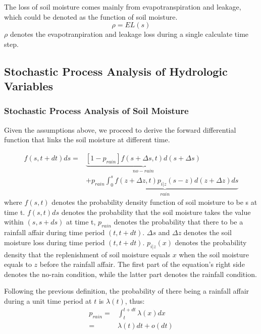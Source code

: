 \documentclass[11pt]{article}
\begin{document}
The loss of soil moisture comes mainly from evapotranspiration and leakage, which could be denoted as the function of soil moisture.
\begin{equation}
\rho=EL(s)
\end{equation}
$\rho$ denotes the evapotranpiration and leakage loss during a single calculate time step.
\subsection{Stochastic Process Analysis of  Hydrologic Variables}
\subsubsection{Stochastic Process Analysis of  Soil Moisture}
Given the assumptions above, we  proceed  to derive the forward differential function that links the soil moisture at different time.

\begin{equation}
\begin{split}
f(s,t+dt)ds=&\underbrace{[1-p_{rain}]f(s+\Delta s,t)d(s+\Delta s)}_{no-rain}\\&+\underbrace{p_{rain} \int_{0}^{s} f(z+\Delta z,t)p_{i|z}(s-z)d(z+\Delta z)ds}_{rain}
\end{split}
\end{equation}
where $f(s,t)$ denotes the probability density function of soil moisture to be s at time t.  $f(s,t)ds$ denotes the probability that the soil moisture takes the value within $(s,s+ds)$ at time t, $ p_{rain}$ denotes the probability that there to be a rainfall affair during time period $(t,t+dt)$.  $\Delta s$ and $\Delta z$ denotes the soil moisture loss during time period $(t,t+dt)$. $p_{i|z}(x)$ denotes the probability density that the replenishment of soil moisture equals $x$ when the soil moisture equals to $z$ before the rainfall affair. The first part of the equation's right side denotes the no-rain condition, while the latter part denotes the rainfall condition.

Following the previous definition, the probability of there being a rainfall affair during a unit time period at $t$ is $\lambda(t)$, thus:
\begin{equation}
\begin{split}
p_{rain}=&\int_t^{t+dt} \lambda(x)dx\\=&\lambda(t)dt+o(dt)
\end{split}
\end{equation}
\end{document}
